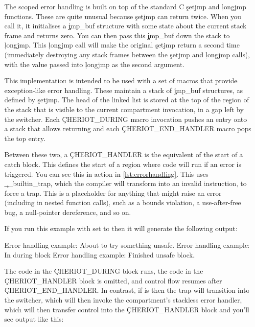 \begin{note}
	The scoped error handling is built on top of the standard C \c{setjmp} and \c{longjmp} functions.
	These are quite unusual because \c{setjmp} can return twice.
	When you call it, it initialises a \c{jmp_buf} structure with some state about the current stack frame and returns zero.
	You can then pass this \c{jmp_buf} down the stack to \c{longjmp}.
	This \c{longjmp} call will make the original \c{setjmp} return a second time (immediately destroying any stack frames between the \c{setjmp} and \c{longjmp} calls), with the value passed into \c{longjmp} as the second argument.
\end{note}

This implementation is intended to be used with a set of macros that provide exception-like error handling.
These maintain a stack of \c{jmp_buf} structures, as defined by \c{setjmp}.
The head of the linked list is stored at the top of the region of the stack that is visible to the current compartment invocation, in a gap left by the switcher.
Each \c{CHERIOT_DURING} macro invocation pushes an entry onto a stack that allows returning and each \c{CHERIOT_END_HANDLER} macro pops the top entry.

Between these two, a \c{CHERIOT_HANDLER} is the equivalent of the start of a catch block.
This defines the start of a region where code will run if an error is triggered.
You can see this in action in \ref{lst:errorhandling}.
This uses \c{__builtin_trap}, which the compiler will transform into an invalid instruction, to force a trap.
This is a placeholder for anything that might raise an error (including in nested function calls), such as a bounds violation, a use-after-free bug, a null-pointer dereference, and so on.


\codelisting[marker=error,caption=Example of using scoped error handling,label=lst:errorhandling, filename=examples/error_handling/errors.cc]{}

If you run this example with  set to  then it will generate the following output:

\begin{console}
Error handling example: About to try something unsafe.
Error handling example: In during block
Error handling example: Finished unsafe block.
\end{console}

The code in the \c{CHERIOT_DURING} block runs, the code in the \c{CHERIOT_HANDLER} block is omitted, and control flow resumes after \c{CHERIOT_END_HANDLER}.
In contrast, if  is  then the trap will transition into the switcher, which will then invoke the compartment's stackless error handler, which will then transfer control into the \c{CHERIOT_HANDLER} block and you'll see output like this:

